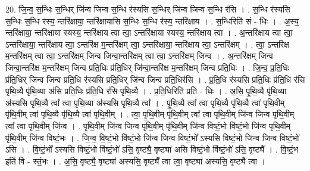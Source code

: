 \documentclass[17pt]{extarticle}
\begin{document}
20. जि॒न्व॒ स॒न्धिः स॒न्धिर् जि॑न्व जिन्व स॒न्धि र॑स्यसि स॒न्धिर् जि॑न्व जिन्व स॒न्धि र॑सि । . स॒न्धि र॑स्यसि स॒न्धिः स॒न्धि र॑स्य॒ न्तरि॑क्षाया॒ न्तरि॑क्षायासि स॒न्धिः स॒न्धि र॑स्य॒ न्तरि॑क्षाय । . स॒न्धिरिति॑ सं - धिः । . अ॒स्य॒ न्तरि॑क्षाया॒ न्तरि॑क्षाया स्यस्य॒ न्तरि॑क्षाय त्वा त्वा॒ ऽन्तरि॑क्षाया स्यस्य॒ न्तरि॑क्षाय त्वा । . अ॒न्तरि॑क्षाय त्वा त्वा॒ ऽन्तरि॑क्षाया॒ न्तरि॑क्षाय त्वा॒ ऽन्तरि॑क्ष म॒न्तरि॑क्षम् त्वा॒ ऽन्तरि॑क्षाया॒ न्तरि॑क्षाय त्वा॒ ऽन्तरि॑क्षम् । . त्वा॒ ऽन्तरि॑क्ष म॒न्तरि॑क्षम् त्वा त्वा॒ ऽन्तरि॑क्षम् जिन्व जिन्वा॒न्तरि॑क्षम् त्वा त्वा॒ ऽन्तरि॑क्षम् जिन्व । . अ॒न्तरि॑क्षम् जिन्व जिन्वा॒न्तरि॑क्ष म॒न्तरि॑क्षम् जिन्व प्रति॒धिः प्र॑ति॒धिर् जि॑न्वा॒न्तरि॑क्ष म॒न्तरि॑क्षम् जिन्व प्रति॒धिः । . जि॒न्व॒ प्र॒ति॒धिः प्र॑ति॒धिर् जि॑न्व जिन्व प्रति॒धि र॑स्यसि प्रति॒धिर् जि॑न्व जिन्व प्रति॒धिर॑सि । . प्र॒ति॒धि र॑स्यसि प्रति॒धिः प्र॑ति॒धि र॑सि पृथि॒व्यै पृ॑थि॒व्या अ॑सि प्रति॒धिः प्र॑ति॒धि र॑सि पृथि॒व्यै । . प्र॒ति॒धिरिति॑ प्रति - धिः । . अ॒सि॒ पृ॒थि॒व्यै पृ॑थि॒व्या अ॑स्यसि पृथि॒व्यै त्वा᳚ त्वा पृथि॒व्या अ॑स्यसि पृथि॒व्यै त्वा᳚ । . पृ॒थि॒व्यै त्वा᳚ त्वा पृथि॒व्यै पृ॑थि॒व्यै त्वा॑ पृथि॒वीम् पृ॑थि॒वीम् त्वा॑ पृथि॒व्यै पृ॑थि॒व्यै त्वा॑ पृथि॒वीम् । . त्वा॒ पृ॒थि॒वीम् पृ॑थि॒वीम् त्वा᳚ त्वा पृथि॒वीम् जि॑न्व जिन्व पृथि॒वीम् त्वा᳚ त्वा पृथि॒वीम् जि॑न्व । . पृ॒थि॒वीम् जि॑न्व जिन्व पृथि॒वीम् पृ॑थि॒वीम् जि॑न्व विष्टं॒भो वि॑ष्टं॒भो जि॑न्व पृथि॒वीम् पृ॑थि॒वीम् जि॑न्व विष्टं॒भः । . जि॒न्व॒ वि॒ष्टं॒भो वि॑ष्टं॒भो जि॑न्व जिन्व विष्टं॒भो᳚ ऽस्यसि विष्टं॒भो जि॑न्व जिन्व विष्टं॒भो॑ ऽसि । . वि॒ष्टं॒भो᳚ ऽस्यसि विष्टं॒भो वि॑ष्टं॒भो॑ ऽसि॒ वृष्ट्यै॒ वृष्ट्या॑ असि विष्टं॒भो वि॑ष्टं॒भो॑ ऽसि॒ वृष्ट्यै᳚ । . वि॒ष्टं॒भ इति॑ वि - स्तं॒भः । . अ॒सि॒ वृष्ट्यै॒ वृष्ट्या॑ अस्यसि॒ वृष्ट्यै᳚ त्वा त्वा॒ वृष्ट्या॑ अस्यसि॒ वृष्ट्यै᳚ त्वा । \newline
\end{document}
